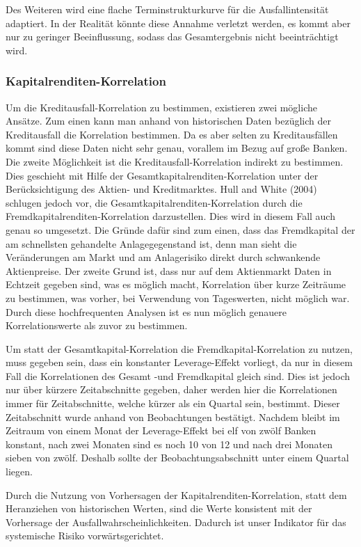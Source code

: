\documentclass[a4paper,12pt]{scrartcl}
\begin{document}
Des Weiteren wird eine flache Terminstrukturkurve für die Ausfallintensität adaptiert. In der Realität könnte diese Annahme verletzt werden, es kommt aber nur zu geringer Beeinflussung, sodass das Gesamtergebnis nicht beeinträchtigt wird.
\newpage
\subsubsection{Kapitalrenditen-Korrelation}
Um die Kreditausfall-Korrelation zu bestimmen, existieren zwei mögliche Ansätze.
Zum einen kann man anhand von historischen Daten bezüglich der Kreditausfall die Korrelation bestimmen. Da es aber selten zu Kreditausfällen kommt sind diese Daten nicht sehr genau, vorallem im Bezug auf große Banken.
Die zweite Möglichkeit ist die Kreditausfall-Korrelation indirekt zu bestimmen. Dies geschieht mit Hilfe der Gesamtkapitalrenditen-Korrelation unter der Berücksichtigung des Aktien- und Kreditmarktes. Hull and White (2004) schlugen jedoch vor, die Gesamtkapitalrenditen-Korrelation durch die Fremdkapitalrenditen-Korrelation darzustellen. Dies wird in diesem Fall auch genau so umgesetzt. Die Gründe dafür sind zum einen, dass das Fremdkapital der am schnellsten gehandelte Anlagegegenstand ist, denn man sieht die Veränderungen am Markt und am Anlagerisiko direkt durch schwankende Aktienpreise. Der zweite Grund ist, dass nur auf dem Aktienmarkt Daten in Echtzeit gegeben sind, was es möglich macht, Korrelation über kurze Zeiträume zu bestimmen, was vorher, bei Verwendung von Tageswerten, nicht möglich war.
Durch diese hochfrequenten Analysen ist es nun möglich genauere Korrelationswerte als zuvor zu bestimmen.

Um statt der Gesamtkapital-Korrelation die Fremdkapital-Korrelation zu nutzen, muss gegeben sein, dass ein konstanter Leverage-Effekt vorliegt, da nur in diesem Fall die Korrelationen des Gesamt -und Fremdkapital gleich sind. Dies ist jedoch nur über kürzere Zeitabschnitte gegeben, daher werden hier die Korrelationen immer für Zeitabschnitte, welche kürzer als ein Quartal sein, bestimmt. Dieser Zeitabschnitt wurde anhand von Beobachtungen bestätigt. Nachdem bleibt im Zeitraum von einem Monat der Leverage-Effekt bei elf von zwölf Banken konstant, nach zwei Monaten sind es noch 10 von 12 und nach drei Monaten sieben von zwölf. Deshalb sollte der Beobachtungsabschnitt unter einem Quartal liegen.

Durch die Nutzung von Vorhersagen der Kapitalrenditen-Korrelation, statt dem Heranziehen von historischen Werten, sind die Werte konsistent mit der Vorhersage der Ausfallwahrscheinlichkeiten. Dadurch ist unser Indikator für das systemische Risiko vorwärtsgerichtet. 
\end{document}

